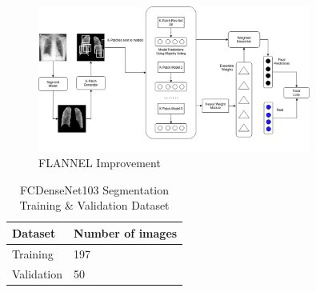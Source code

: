 \documentclass{sigkddExp}
\begin{document}
\begin{figure}[h]
    \includegraphics[width=0.8\textwidth]{../doc/images/FLANNEL-IMPROVED.png}
    \caption{FLANNEL Improvement}
    \label{fig:improve}
\end{figure}



\begin{table}
    \caption{FC\-DenseNet103 Segmentation Training \& Validation Dataset}
    \label{table:segdata}
    \begin{tabular}{ll} \hline
        Dataset    & Number of images \\ \hline
        Training   & 197              \\
        Validation & 50               \\
        \hline
    \end{tabular}

\end{table}
\end{document}
